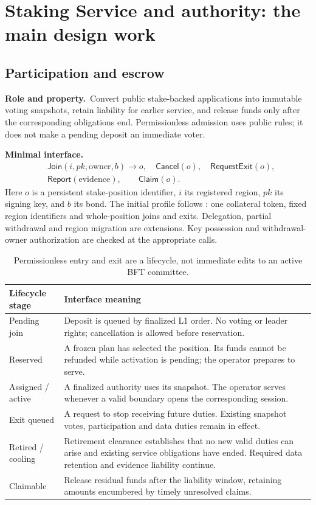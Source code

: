 \documentclass[11pt,a4paper]{article}
\newcommand{\api}[1]{\ensuremath{\mathsf{#1}}}
\newcommand{\role}{\textbf{Role and property.}\ }
\newcommand{\iface}{\textbf{Minimal interface.}\ }
\newcommand{\src}[2]{\href{#1}{\texttt{\detokenize{#2}}}}
\begin{document}
\section{Staking Service and authority: the main design work}\label{sec:staking}
\subsection{Participation and escrow}
\role Convert public stake-backed applications into immutable voting
snapshots, retain liability for earlier service, and release funds only
after the corresponding obligations end. Permissionless admission uses
public rules; it does not make a pending deposit an immediate voter.

\iface
\[
\begin{aligned}
 &\api{Join}(i,pk,\text{owner},b)\to o,\quad
   \api{Cancel}(o),\quad \api{RequestExit}(o),\\
 &\api{Report}(\text{evidence}),\qquad \api{Claim}(o).
\end{aligned}
\]
Here $o$ is a persistent stake-position identifier, $i$ its registered
region, $pk$ its signing key, and $b$ its bond. The initial profile follows
\src{../formalization/staking_rotation_module_v2.tex}{staking module v2}:
one collateral token, fixed region identifiers and whole-position joins
and exits. Delegation, partial withdrawal and region migration are
extensions. Key possession and withdrawal-owner authorization are checked
at the appropriate calls.

\begin{table}[H]\centering\small
\begin{tabularx}{\linewidth}{@{}p{.22\linewidth}Y@{}}
\toprule Lifecycle stage & Interface meaning\\\midrule
Pending join & Deposit is queued by finalized L1 order. No voting or
leader rights; cancellation is allowed before reservation.\\
Reserved & A frozen plan has selected the position. Its funds cannot be
refunded while activation is pending; the operator prepares to serve.\\
Assigned / active & A finalized authority uses its snapshot. The operator
serves whenever a valid boundary opens the corresponding session.\\
Exit queued & A request to stop receiving future duties. Existing
snapshot votes, participation and data duties remain in effect.\\
Retired / cooling & Retirement clearance establishes that no new valid
duties can arise and existing service obligations have ended. Required
data retention and evidence liability continue.\\
Claimable & Release residual funds after the liability window, retaining
amounts encumbered by timely unresolved claims.\\\bottomrule
\end{tabularx}
\caption{Permissionless entry and exit are a lifecycle, not immediate
edits to an active BFT committee.}
\end{table}
\end{document}
